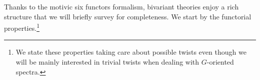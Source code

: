 Thanks to the motivic six functors formalism, bivariant theories enjoy a rich structure
that we will briefly survey for completeness. We start by the functorial properties.\footnote{We state
 these properties taking care about possible twists even though we will be mainly interested in trivial twists
 when dealing with $G$-oriented spectra.}

